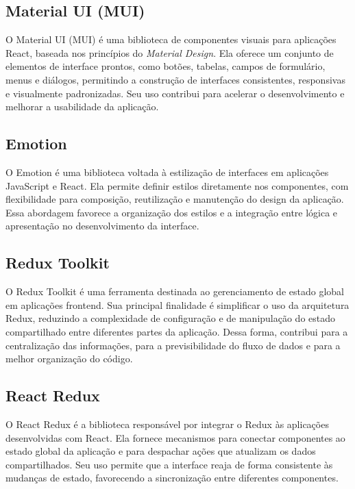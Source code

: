 \documentclass[grad,pdftex]{poli}
\begin{document}
\subsection{Material UI (MUI)}

O Material UI (MUI) é uma biblioteca de componentes visuais para aplicações React, baseada nos princípios do \textit{Material Design}. Ela oferece um conjunto de elementos de interface prontos, como botões, tabelas, campos de formulário, menus e diálogos, permitindo a construção de interfaces consistentes, responsivas e visualmente padronizadas. Seu uso contribui para acelerar o desenvolvimento e melhorar a usabilidade da aplicação.

\subsection{Emotion}

O Emotion é uma biblioteca voltada à estilização de interfaces em aplicações JavaScript e React. Ela permite definir estilos diretamente nos componentes, com flexibilidade para composição, reutilização e manutenção do design da aplicação. Essa abordagem favorece a organização dos estilos e a integração entre lógica e apresentação no desenvolvimento da interface.

\subsection{Redux Toolkit}

O Redux Toolkit é uma ferramenta destinada ao gerenciamento de estado global em aplicações frontend. Sua principal finalidade é simplificar o uso da arquitetura Redux, reduzindo a complexidade de configuração e de manipulação do estado compartilhado entre diferentes partes da aplicação. Dessa forma, contribui para a centralização das informações, para a previsibilidade do fluxo de dados e para a melhor organização do código.

\subsection{React Redux}

O React Redux é a biblioteca responsável por integrar o Redux às aplicações desenvolvidas com React. Ela fornece mecanismos para conectar componentes ao estado global da aplicação e para despachar ações que atualizam os dados compartilhados. Seu uso permite que a interface reaja de forma consistente às mudanças de estado, favorecendo a sincronização entre diferentes componentes.
\end{document}
